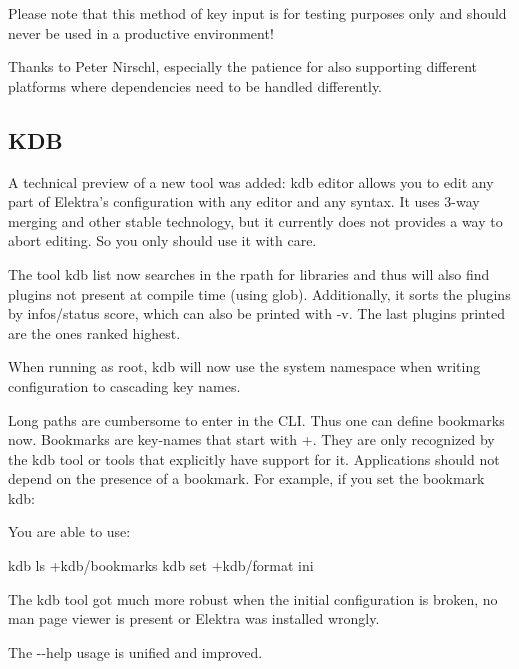 Please note that this method of key input is for testing purposes only and should never be used in a productive environment!

Thanks to Peter Nirschl, especially the patience for also supporting different platforms where dependencies need to be handled differently.

\subsection*{K\+D\+B}

A technical preview of a new tool was added\+: {\ttfamily kdb editor} allows you to edit any part of Elektra's configuration with any editor and any syntax. It uses 3-\/way merging and other stable technology, but it currently does not provides a way to abort editing. So you only should use it with care.

The tool {\ttfamily kdb list} now searches in the rpath for libraries and thus will also find plugins not present at compile time (using {\ttfamily glob}). Additionally, it sorts the plugins by {\ttfamily infos/status} score, which can also be printed with {\ttfamily -\/v}. The last plugins printed are the ones ranked highest.

When running as root, {\ttfamily kdb} will now use the {\ttfamily system} namespace when writing configuration to cascading key names.

Long paths are cumbersome to enter in the C\+L\+I. Thus one can define bookmarks now. Bookmarks are key-\/names that start with {\ttfamily +}. They are only recognized by the {\ttfamily kdb} tool or tools that explicitly have support for it. Applications should not depend on the presence of a bookmark. For example, if you set the bookmark kdb\+: 


You are able to use\+: \begin{DoxyVerb}    kdb ls +kdb/bookmarks
    kdb set +kdb/format ini
\end{DoxyVerb}


The kdb tool got much more robust when the initial configuration is broken, no man page viewer is present or Elektra was installed wrongly.

The {\ttfamily -\/-\/help} usage is unified and improved.


